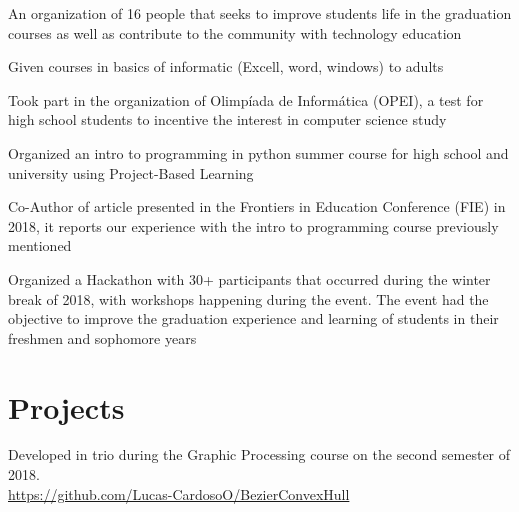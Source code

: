 \documentclass[]{deedy-resume-openfont}
\begin{document}
\begin{minipage}[t]{0.64\textwidth}
\begin{tightemize}
\item An organization of 16 people that seeks to improve students life in the graduation courses as well as contribute to the community with technology education
\item Given courses in basics of informatic (Excell, word, windows) to adults
\item Took part in the organization of Olimpíada de Informática (OPEI), a test for high school students to incentive the interest in computer science study
\item Organized an intro to programming in python summer course for high school and university using Project-Based Learning
\item Co-Author of article presented in the Frontiers in Education Conference (FIE) in 2018, it reports our experience with the intro to programming course previously mentioned
\item Organized a Hackathon with 30+ participants that occurred during the winter break of 2018, with workshops happening during the event. The event had the objective to improve the graduation experience and learning of students in their freshmen and sophomore years
\end{tightemize}
\sectionsep





\section{Projects}

\begin{tightemize}
\item Developed in trio during the Graphic Processing course on the second semester of 2018. \\ \href{https://github.com/Lucas-CardosoO/BezierConvexHull}{https://github.com/Lucas-CardosoO/BezierConvexHull}
\end{tightemize}
\sectionsep


\end{minipage}
\end{document}
